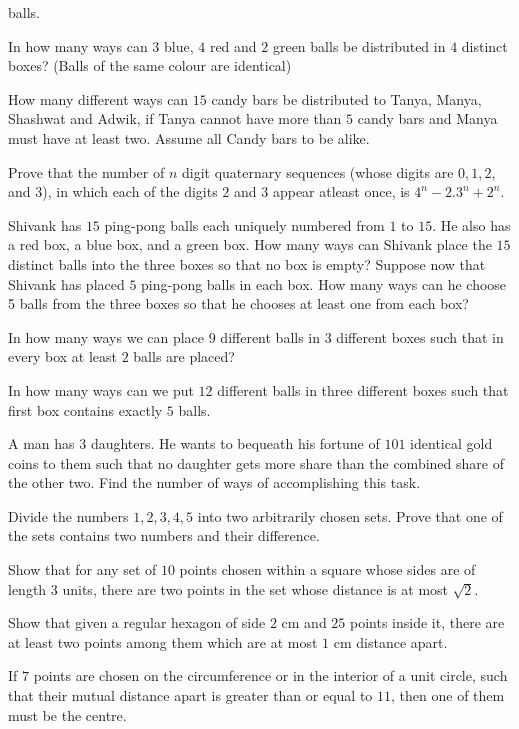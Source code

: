   balls.
\item In how many ways can $3$ blue, $4$ red and $2$ green balls be distributed in $4$ distinct boxes?
  (Balls of the same colour are identical)
\item How many different ways can $15$ candy bars be distributed to Tanya, Manya, Shashwat and Adwik, if
  Tanya cannot have more than $5$ candy bars and Manya must have at least two. Assume all Candy bars to be
  alike.
\item Prove that the number of $n$ digit quaternary sequences (whose digits are $0, 1, 2$, and $3$), in
  which each of the digits $2$ and $3$ appear atleast once, is $4^n - 2.3^n + 2^n$.
\item Shivank has $15$ ping-pong balls each uniquely numbered from $1$ to $15$. He also has a red box, a
  blue box, and a green box. How many ways can Shivank place the $15$ distinct balls into the three boxes
  so that no box is empty? Suppose now that Shivank has placed $5$ ping-pong balls in each box. How many
  ways can he choose 5 balls from the three boxes so that he chooses at least one from each box?
\item In how many ways we can place $9$ different balls in 3 different boxes such that in every box at least
  $2$ balls are placed?
\item In how many ways can we put $12$ different balls in three different boxes such that first box contains
  exactly $5$ balls.
\item A man has $3$ daughters. He wants to bequeath his fortune of $101$ identical gold coins to them such
  that no daughter gets more share than the combined share of the other two. Find the number of ways of
  accomplishing this task.
\item Divide the numbers $1, 2, 3, 4, 5$ into two arbitrarily chosen sets. Prove that one of the sets
  contains two numbers and their difference.
\item Show that for any set of $10$ points chosen within a square whose sides are of length $3$ units, there
  are two points in the set whose distance is at most $\sqrt{2}$.
\item Show that given a regular hexagon of side $2$ cm and $25$ points inside it, there are at least two
  points among them which are at most $1$ cm distance apart.
\item If $7$ points are chosen on the circumference or in the interior of a unit circle, such that their
  mutual distance apart is greater than or equal to $11$, then one of them must be the centre.

